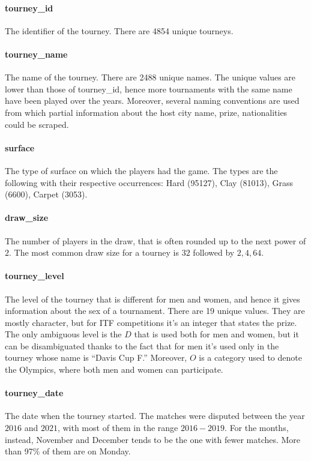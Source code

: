 \documentclass{article}
\begin{document}
\paragraph{tourney\_id}
The identifier of the tourney. There are 4854 unique tourneys.

\paragraph{tourney\_name}
The name of the tourney. There are 2488 unique names. The unique values are lower than those of tourney\_id, hence more tournaments with the same name have been played over the years. Moreover, several naming conventions are used from which partial information about the host city name, prize, nationalities could be scraped.

\paragraph{surface}
The type of surface on which the players had the game. The types are the following with their respective occurrences: Hard (95127), Clay (81013), Grass (6600), Carpet (3053).

\paragraph{draw\_size}
The number of players in the draw, that is often rounded up to the next power of $2$. The most common draw size for a tourney is $32$ followed by $2,4,64$.

\paragraph{tourney\_level}
The level of the tourney that is different for men and women, and hence it gives information about the sex of a tournament. There are 19 unique values. They are mostly character, but for ITF competitions it's an integer that states the prize. The only ambiguous level is the $D$ that is used both for men and women, but it can be disambiguated thanks to the fact that for men it's used only in the tourney whose name is “Davis Cup F.” Moreover, $O$ is a category used to denote the Olympics, where both men and women can participate.

\paragraph{tourney\_date}
The date when the tourney started.
The matches were disputed between the year $2016$ and $2021$, with most of them in the range $2016-2019$. For the months, instead, November and December tends to be the one with fewer matches. More than 97\% of them are on Monday.
\end{document}
